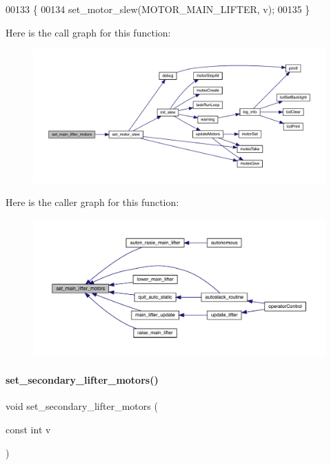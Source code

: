 \begin{DoxyCode}
00133                                          \{
00134   set_motor_slew(MOTOR\_MAIN\_LIFTER, v);
00135 \}
\end{DoxyCode}
Here is the call graph for this function\+:
\nopagebreak
\begin{figure}[H]
\begin{center}
\leavevmode
\includegraphics[width=350pt]{lifter_8c_ad00a195af30f246924d6e1a30095b882_cgraph}
\end{center}
\end{figure}
Here is the caller graph for this function\+:
\nopagebreak
\begin{figure}[H]
\begin{center}
\leavevmode
\includegraphics[width=350pt]{lifter_8c_ad00a195af30f246924d6e1a30095b882_icgraph}
\end{center}
\end{figure}
\mbox{\label{lifter_8c_a78640d547d9361951a92d0bc00939536}} 
\paragraph{set\+\_\+secondary\+\_\+lifter\+\_\+motors()}
{\footnotesize\ttfamily void set\+\_\+secondary\+\_\+lifter\+\_\+motors (\begin{DoxyParamCaption}\item[{const int}]{v }\end{DoxyParamCaption})}



